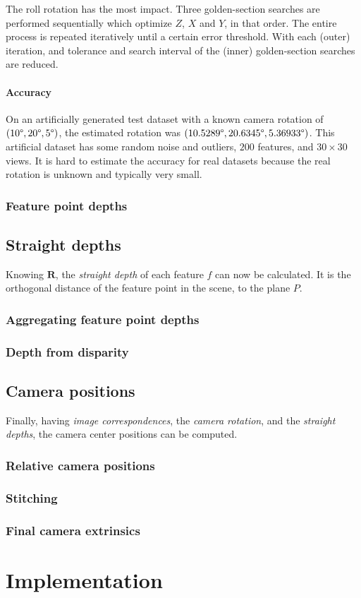 \documentclass{scrreprt}
\newcommand{\matr}[1]{\mathbf{#1}}
\newcommand{\degr}{\text{\textdegree}}
\begin{document}
The roll rotation has the most impact. Three golden-section searches are performed sequentially which optimize $Z$, $X$ and $Y$, in that order. The entire process is repeated iteratively until a certain error threshold. With each (outer) iteration, and tolerance and search interval of the (inner) golden-section searches are reduced.

\subsubsection{Accuracy}
On an artificially generated test dataset with a known camera rotation of $(10\degr, 20\degr, 5\degr)$, the estimated rotation was $(10.5289\degr, 20.6345\degr, 5.36933\degr)$. This artificial dataset has some random noise and outliers, $200$ features, and $30 \times 30$ views. It is hard to estimate the accuracy for real datasets because the real rotation is unknown and typically very small.

\pagebreak

\subsection{Feature point depths}
\label{sec:depthrot}



\section{Straight depths}
\label{ref:straightdepths}
Knowing $\matr{R}$, the \emph{straight depth} of each feature $f$ can now be calculated. It is the orthogonal distance of the feature point in the scene, to the plane $P$.
\subsection{Aggregating feature point depths}

\subsection{Depth from disparity}

\section{Camera positions}
Finally, having \emph{image correspondences}, the \emph{camera rotation}, and the \emph{straight depths}, the camera center positions can be computed.

\subsection{Relative camera positions}

\subsection{Stitching}

\subsection{Final camera extrinsics}

\chapter{Implementation}

 
\end{document}
